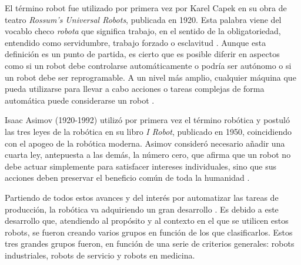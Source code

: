 El término robot fue utilizado por primera vez por Karel Capek en su obra de teatro \textit{Rossum’s Universal Robots}, publicada en 1920. Esta palabra viene del vocablo checo \textit{robota} que significa trabajo, en el sentido de la obligatoriedad, entendido como servidumbre, trabajo forzado o esclavitud \cite{Sanchez07a}. Aunque esta definición es un punto de partida, es cierto que es posible diferir en aspectos como si un robot debe controlarse automáticamente o podría ser autónomo o si un robot debe ser reprogramable. A un nivel más amplio, cualquier máquina que pueda utilizarse para llevar a cabo acciones o tareas complejas de forma automática puede considerarse un robot \cite{Raj19}.

Isaac Asimov (1920-1992) utilizó por primera vez el término robótica y postuló las tres leyes de la robótica en su libro \textit{I Robot}, publicado en 1950, coincidiendo con el apogeo de la robótica moderna. Asimov consideró necesario añadir una cuarta ley, antepuesta a las demás, la número cero, que afirma que un robot no debe actuar simplemente para satisfacer intereses individuales, sino que sus acciones deben preservar el beneficio común de toda la humanidad \cite{Sanchez07b}.


Partiendo de todos estos avances y del interés por automatizar las tareas de producción, la robótica va adquiriendo un gran desarrollo \cite{Sanchez07b}. Es debido a este desarrollo que, atendiendo al propósito y al contexto en el que se utilicen estos robots, se fueron creando varios grupos en función de los que clasificarlos. Estos tres grandes grupos fueron, en función de una serie de criterios generales: robots industriales, robots de servicio y robots en medicina.

